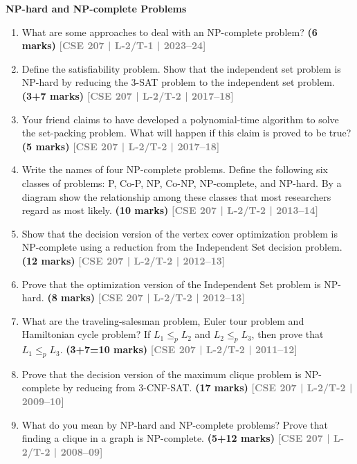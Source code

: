 \documentclass[12pt,a3paper]{article}
\newcommand{\yr}[1]{\hfill\textcolor{gray}{\small\textbf{[#1]}}}
\newcommand{\mk}[1]{\textcolor{orange!70!black}{\small\textbf{(#1 marks)}}}
\newcommand{\subtopic}[2]{%
  \vspace{10pt}
  \noindent\begin{tcolorbox}[colback=#1!8,colframe=#1,boxrule=0.6pt,arc=4pt,
    left=6pt,right=6pt,top=4pt,bottom=4pt]
    \small\bfseries\textcolor{#1}{#2}
  \end{tcolorbox}
  \vspace{2pt}
}
\begin{document}
\subtopic{cD}{NP-hard and NP-complete Problems}
\label{sub:s4-nphard}

\begin{enumerate}

\item What are some approaches to deal with an NP-complete problem?
\mk{6} \yr{CSE 207 | L-2/T-1 | 2023--24}

\item Define the satisfiability problem. Show that the independent set problem is NP-hard by reducing the 3-SAT problem to the independent set problem. \mk{3+7}
\yr{CSE 207 | L-2/T-2 | 2017--18}

\item Your friend claims to have developed a polynomial-time algorithm to solve the set-packing problem. What will happen if this claim is proved to be true? \mk{5}
\yr{CSE 207 | L-2/T-2 | 2017--18}

\item Write the names of four NP-complete problems. Define the following six classes of problems: P, Co-P, NP, Co-NP, NP-complete, and NP-hard. By a diagram show the relationship among these classes that most researchers regard as most likely.
\mk{10} \yr{CSE 207 | L-2/T-2 | 2013--14}

\item Show that the decision version of the vertex cover optimization problem is NP-complete using a reduction from the Independent Set decision problem. \mk{12}
\yr{CSE 207 | L-2/T-2 | 2012--13}

\item Prove that the optimization version of the Independent Set problem is NP-hard. \mk{8}
\yr{CSE 207 | L-2/T-2 | 2012--13}

\item What are the traveling-salesman problem, Euler tour problem and Hamiltonian cycle problem? If $L_1 \leq_p L_2$ and $L_2 \leq_p L_3$, then prove that $L_1 \leq_p L_3$. \mk{3+7=10}
\yr{CSE 207 | L-2/T-2 | 2011--12}


\item Prove that the decision version of the maximum clique problem is NP-complete by reducing from 3-CNF-SAT. \mk{17}
\yr{CSE 207 | L-2/T-2 | 2009--10}

\item What do you mean by NP-hard and NP-complete problems? Prove that finding a clique in a graph is NP-complete. \mk{5+12}
\yr{CSE 207 | L-2/T-2 | 2008--09}


\end{enumerate}
\end{document}
